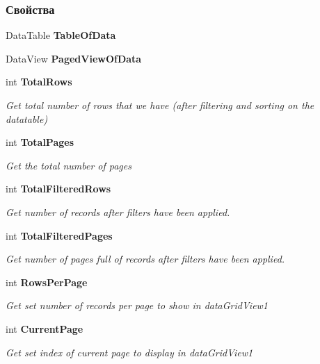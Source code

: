 \subsubsection*{Свойства}
\begin{DoxyCompactItemize}
\item 
Data\+Table {\bfseries Table\+Of\+Data}\hspace{0.3cm}{\ttfamily  [get, set]}\label{classkdz__manager_1_1_view_data_ad84722e9a8f5adae9bac98f2f7f75079}

\item 
Data\+View {\bfseries Paged\+View\+Of\+Data}\hspace{0.3cm}{\ttfamily  [get]}\label{classkdz__manager_1_1_view_data_a2ad9133ee389a2b7f848e73494695bcc}

\item 
int {\bf Total\+Rows}\hspace{0.3cm}{\ttfamily  [get]}
\begin{DoxyCompactList}\small\item\em Get total number of rows that we have (after filtering and sorting on the datatable) \end{DoxyCompactList}\item 
int {\bf Total\+Pages}\hspace{0.3cm}{\ttfamily  [get]}
\begin{DoxyCompactList}\small\item\em Get the total number of pages \end{DoxyCompactList}\item 
int {\bf Total\+Filtered\+Rows}\hspace{0.3cm}{\ttfamily  [get]}
\begin{DoxyCompactList}\small\item\em Get number of records after filters have been applied. \end{DoxyCompactList}\item 
int {\bf Total\+Filtered\+Pages}\hspace{0.3cm}{\ttfamily  [get]}
\begin{DoxyCompactList}\small\item\em Get number of pages full of records after filters have been applied. \end{DoxyCompactList}\item 
int {\bf Rows\+Per\+Page}\hspace{0.3cm}{\ttfamily  [get]}
\begin{DoxyCompactList}\small\item\em Get set number of records per page to show in data\+Grid\+View1 \end{DoxyCompactList}\item 
int {\bf Current\+Page}\hspace{0.3cm}{\ttfamily  [get]}
\begin{DoxyCompactList}\small\item\em Get set index of current page to display in data\+Grid\+View1 \end{DoxyCompactList}\end{DoxyCompactItemize}


